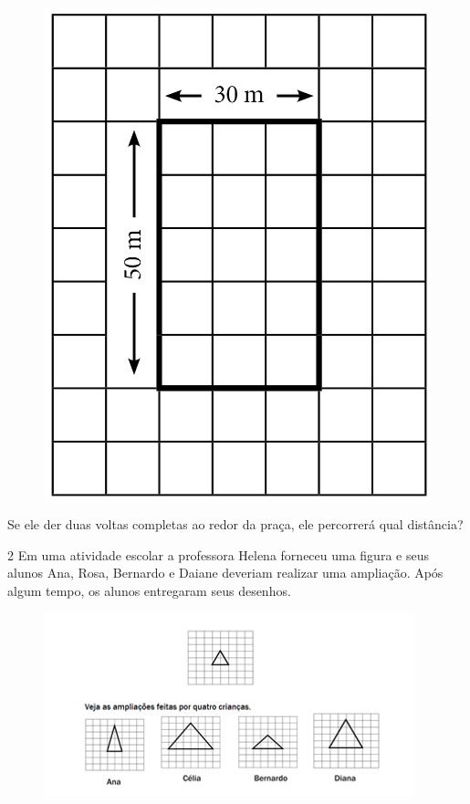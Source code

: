\begin{figure}[htpb!]
\centering
\includegraphics[width=.8\textwidth]{../ilustracoes/MAT5/SAEB_5ANO_MAT_figura35.png}
\end{figure}

Se ele der duas voltas completas ao redor da praça, ele percorrerá qual
distância?


\pagebreak

\num{2} Em uma atividade escolar a professora Helena forneceu uma figura e
seus alunos Ana, Rosa, Bernardo e Daiane deveriam realizar uma ampliação. Após algum tempo, os alunos entregaram seus desenhos.

\begin{figure}[htpb!]
\centering
\includegraphics[width=\textwidth]{./imgs/mat5.png}
\end{figure}

